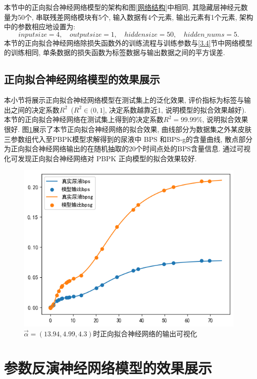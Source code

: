 \documentclass[a4paper,punct=banjiao,twoside]{ctexrep}
\theoremstyle{plain}
\theoremstyle{definition}
\theoremstyle{remark}
\begin{document}
本节中的正向拟合神经网络模型的架构和图\ref{网络结构}中相同, 其隐藏层神经元数量为50个, 串联残差网络模块有5个, 输入数据有4个元素, 输出元素有1个元素,
架构中的参数相应地设置为:
$$
inputsize = 4,\quad outputsize = 1,\quad hiddensize = 50, \quad hidden\_nums = 5.
$$
本节的正向拟合神经网络除损失函数外的训练流程与训练参数与\ref{3.4}节中网络模型的训练相同, 单条数据的损失函数为标签数据与输出数据之间的平方误差.

\subsection*{正向拟合神经网络模型的效果展示}
本小节将展示正向拟合神经网络模型在测试集上的泛化效果, 评价指标为标签与输出之间的决定系数$R^2$ $\,$($R^2 \in (0,1]$, 决定系数越靠近1, 说明模型的拟合效果越好).
本节的正向拟合神经网络在测试集上得到的决定系数$R^2 = 99.99\%$, 说明拟合效果很好. 图\ref{正向效果2}展示了本节正向拟合神经网络的拟合效果, 曲线部分为数据集之外某皮肤
三参数组代入至PBPK模型求解得到的尿液中 BPS 和BPS-g的含量曲线, 散点部分为正向拟合神经网络输出的在随机抽取的20个时间点处的BPS含量信息. 通过可视化可发现正向拟合神经网络对 PBPK 正向模型的拟合效果较好.
\begin{figure}[H]
  \centering
  \includegraphics[scale=0.5]{./figs/p10.png}
  \caption{$\vec{\alpha}=(13.94 ,  4.99,  4.3)$时正向拟合神经网络的输出可视化}
  \label{正向效果2}
\end{figure}

\section{参数反演神经网络模型的效果展示}
\end{document}
